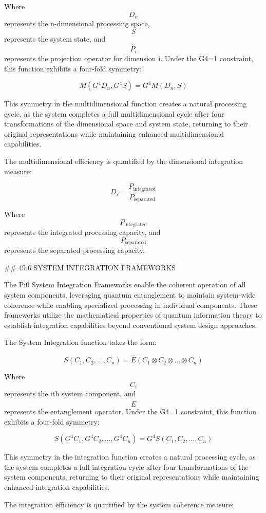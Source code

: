 Where $$ D_n $$ represents the n-dimensional processing space, $$ S $$ represents the system state, and $$ \hat{P}_i $$ represents the projection operator for dimension i. Under the G4=1 constraint, this function exhibits a four-fold symmetry:

$$ M(G^4 D_n, G^4 S) = G^4 M(D_n, S) $$

This symmetry in the multidimensional function creates a natural processing cycle, as the system completes a full multidimensional cycle after four transformations of the dimensional space and system state, returning to their original representations while maintaining enhanced multidimensional capabilities.

The multidimensional efficiency is quantified by the dimensional integration measure:

$$ D_i = \frac{P_{\text{integrated}}}{P_{\text{separated}}} $$

Where $$ P_{\text{integrated}} $$ represents the integrated processing capacity, and $$ P_{\text{separated}} $$ represents the separated processing capacity.

## 49.6 SYSTEM INTEGRATION FRAMEWORKS

The Pi0 System Integration Frameworks enable the coherent operation of all system components, leveraging quantum entanglement to maintain system-wide coherence while enabling specialized processing in individual components. These frameworks utilize the mathematical properties of quantum information theory to establish integration capabilities beyond conventional system design approaches.

The System Integration function takes the form:

$$ S(C_1, C_2, ..., C_n) = \hat{E}(C_1 \otimes C_2 \otimes ... \otimes C_n) $$

Where $$ C_i $$ represents the ith system component, and $$ \hat{E} $$ represents the entanglement operator. Under the G4=1 constraint, this function exhibits a four-fold symmetry:

$$ S(G^4 C_1, G^4 C_2, ..., G^4 C_n) = G^4 S(C_1, C_2, ..., C_n) $$

This symmetry in the integration function creates a natural processing cycle, as the system completes a full integration cycle after four transformations of the system components, returning to their original representations while maintaining enhanced integration capabilities.

The integration efficiency is quantified by the system coherence measure:

